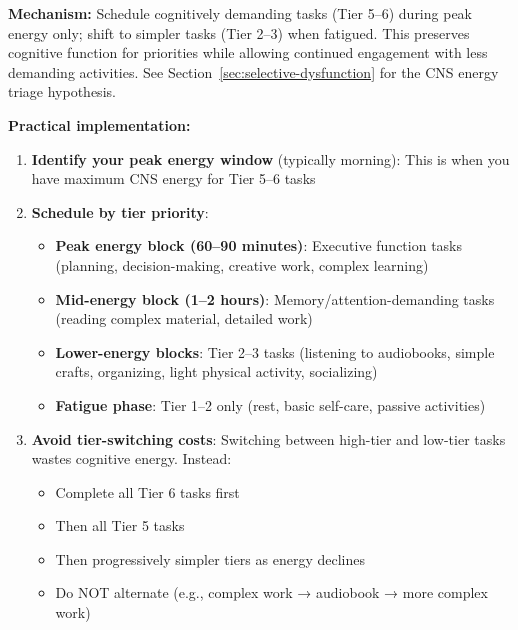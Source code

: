 \begin{recommendation}
\label{rec:cognitive-hierarchy-scheduling}

\textbf{Mechanism:} Schedule cognitively demanding tasks (Tier 5--6) during peak energy only; shift to simpler tasks (Tier 2--3) when fatigued. This preserves cognitive function for priorities while allowing continued engagement with less demanding activities. See Section~\ref{sec:selective-dysfunction} for the CNS energy triage hypothesis.

\textbf{Practical implementation:}

\begin{enumerate}
    \item \textbf{Identify your peak energy window} (typically morning): This is when you have maximum CNS energy for Tier 5--6 tasks

    \item \textbf{Schedule by tier priority}:
    \begin{itemize}
        \item \textbf{Peak energy block (60--90 minutes)}: Executive function tasks (planning, decision-making, creative work, complex learning)
        \item \textbf{Mid-energy block (1--2 hours)}: Memory/attention-demanding tasks (reading complex material, detailed work)
        \item \textbf{Lower-energy blocks}: Tier 2--3 tasks (listening to audiobooks, simple crafts, organizing, light physical activity, socializing)
        \item \textbf{Fatigue phase}: Tier 1--2 only (rest, basic self-care, passive activities)
    \end{itemize}

    \item \textbf{Avoid tier-switching costs}: Switching between high-tier and low-tier tasks wastes cognitive energy. Instead:
    \begin{itemize}
        \item Complete all Tier 6 tasks first
        \item Then all Tier 5 tasks
        \item Then progressively simpler tiers as energy declines
        \item Do NOT alternate (e.g., complex work → audiobook → more complex work)
    \end{itemize}


\end{enumerate}
\end{recommendation}
